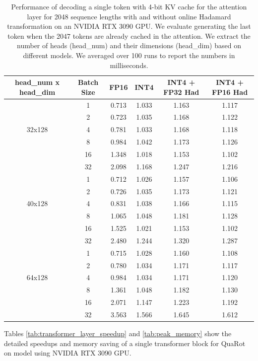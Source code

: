 \clearpage
 \begin{table}[H]
    \centering
    \begin{tabular}{c|c|c|c|c|c}
\toprule
head\_num x head\_dim & Batch Size  &  FP16 & INT4 & INT4 + FP32  Had & INT4 + FP16 Had\\
\midrule
\multirow{5}{*}{32x128} &    1 & 0.713 & 1.033 & 1.163 & 1.117\\
& 2 & 0.723 & 1.035 & 1.168 & 1.122\\
 &    4 &  0.781 & 1.033 & 1.168 & 1.118\\
 &    8 &   0.984 & 1.042 & 1.173 & 1.126\\
 &    16 & 1.348 & 1.018 & 1.153 & 1.102\\
 &    32 & 2.098 & 1.168 & 1.247 & 1.216\\
\midrule
 \multirow{5}{*}{40x128} &    1 & 0.712 & 1.026 & 1.157 & 1.106\\
 & 2 & 0.726 & 1.035 & 1.173 & 1.121\\
 &    4 & 0.831 & 1.038 & 1.166 & 1.115\\
 &    8 & 1.065 & 1.048 & 1.181 & 1.128\\
 &    16 & 1.525 & 1.021 & 1.153 & 1.102\\
 &    32 & 2.480 & 1.244 & 1.320 & 1.287\\
 \midrule
 \multirow{5}{*}{64x128} &    1 &0.715 & 1.028 & 1.160 & 1.108\\
 & 2 & 0.780 & 1.034 & 1.171 & 1.117\\
 &    4 &  0.984 & 1.034 & 1.171 & 1.120\\
 &    8 & 1.361 & 1.048 & 1.182 & 1.130\\
 &    16 & 2.071 & 1.147 & 1.223 & 1.192\\
 &    32 & 3.563 & 1.566 & 1.645 & 1.612\\
\bottomrule
\end{tabular}
\vspace{0.5em}
    \caption{Performance of decoding a single token with 4-bit KV cache for the attention layer for 2048 sequence lengths with and without online Hadamard transformation on an NVIDIA RTX 3090 GPU. We evaluate generating the last token when the 2047 tokens are already cached in the attention.  We extract the number of heads (head\_num) and their dimensions (head\_dim) based on different \llama models. We averaged over 100 runs to report the numbers in milliseconds.
    }
    \label{tab:QAttention_bench}
\end{table}


Tables \ref{tab:transformer_layer_speedup} and \ref{tab:peak_memory} show the detailed speedups and memory saving of a single transformer block for QuaRot on \llamaSmall model using NVIDIA RTX 3090 GPU.

